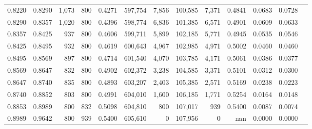 \begin{tabular}{rrrrrrrrrrrrr}
0.8220 & 0.8290 &  1,073 & 800 &                                     0.4271 & 597,754 &   7,856 & 100,585 &   7,371 & 0.4841 & 0.0683 & 0.0728 \\
0.8290 & 0.8357 &  1,020 & 800 &                                     0.4396 & 598,774 &   6,836 & 101,385 &   6,571 & 0.4901 & 0.0609 & 0.0633 \\
0.8357 & 0.8425 &    937 & 800 &                                     0.4606 & 599,711 &   5,899 & 102,185 &   5,771 & 0.4945 & 0.0535 & 0.0546 \\
0.8425 & 0.8495 &    932 & 800 &                                     0.4619 & 600,643 &   4,967 & 102,985 &   4,971 & 0.5002 & 0.0460 & 0.0460 \\
0.8495 & 0.8569 &    897 & 800 &                                     0.4714 & 601,540 &   4,070 & 103,785 &   4,171 & 0.5061 & 0.0386 & 0.0377 \\
0.8569 & 0.8647 &    832 & 800 &                                     0.4902 & 602,372 &   3,238 & 104,585 &   3,371 & 0.5101 & 0.0312 & 0.0300 \\
0.8647 & 0.8740 &    835 & 800 &                                     0.4893 & 603,207 &   2,403 & 105,385 &   2,571 & 0.5169 & 0.0238 & 0.0223 \\
0.8740 & 0.8852 &    803 & 800 &                                     0.4991 & 604,010 &   1,600 & 106,185 &   1,771 & 0.5254 & 0.0164 & 0.0148 \\
0.8853 & 0.8989 &    800 & 832 &                                     0.5098 & 604,810 &     800 & 107,017 &     939 & 0.5400 & 0.0087 & 0.0074 \\
0.8989 & 0.9642 &    800 & 939 &                                     0.5400 & 605,610 &       0 & 107,956 &       0 &    nan & 0.0000 & 0.0000 \\
\bottomrule
\end{tabular}
